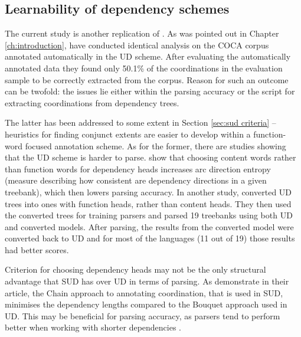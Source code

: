 \subsection{Learnability of dependency schemes}
The current study is another replication of \cite{prz:woz:23}. As was pointed out in Chapter \ref{ch:introduction}, \cite{pbg2023} have conducted identical analysis on the COCA corpus annotated automatically in the UD scheme. After evaluating the automatically annotated data they found only 50.1\% of the coordinations in the evaluation sample to be correctly extracted from the corpus. Reason for such an outcome can be twofold: the issues lie either within the parsing accuracy or the script for extracting coordinations from dependency trees. 

The latter has been addressed to some extent in Section \ref{sec:sud criteria} -- heuristics for finding conjunct extents are easier to develop within a function-word focused annotation scheme. As for the former, there are studies showing that the UD scheme is harder to parse. \cite{rehbein-etal-2017-universal} show that choosing content words rather than function words for dependency heads increases arc direction entropy (measure describing how consistent are dependency directions in a given treebank), which then lowers parsing accuracy. In another study, \cite{kohita-etal-2017-multilingual} converted UD trees into ones with function heads, rather than content heads. They then used the converted trees for training parsers and parsed 19 treebanks using both UD and converted models. After parsing, the results from the converted model were converted back to UD and for most of the languages (11 out of 19) those results had better scores. 

Criterion for choosing dependency heads may not be the only structural advantage that SUD has over UD in terms of parsing. As \cite{gerdes-etal-2018-sud} demonstrate in their article, the Chain approach to annotating coordination, that is used in SUD, minimises the dependency lengths compared to the Bouquet approach used in UD. This may be beneficial for parsing accuracy, as parsers tend to perform better when working with shorter dependencies \citep{nilsson-etal-2006-graph, eisner-smith-2005-parsing}. 

